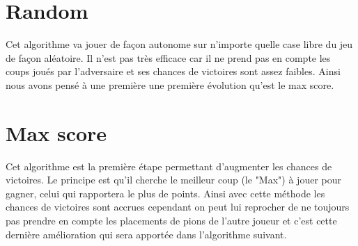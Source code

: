 \documentclass{report}
\begin{document}
		\section{Random}
		Cet algorithme va jouer de façon autonome sur n'importe quelle case libre du jeu de façon aléatoire. Il n'est pas très efficace car il ne prend pas en compte les coups joués par l'adversaire et ses chances de victoires sont assez faibles. Ainsi nous avons pensé à une première une première évolution qu'est le max score.
		\section{Max score}
		Cet algorithme est la première étape permettant d'augmenter les chances de victoires. Le principe est qu'il cherche le meilleur coup (le "Max") à jouer pour gagner, celui qui rapportera le plus de points. Ainsi avec cette méthode les chances de victoires sont accrues cependant on peut lui reprocher de ne toujours pas prendre en compte les placements de pions de l'autre joueur et c'est cette dernière amélioration qui sera apportée dans l'algorithme suivant.
\end{document}
